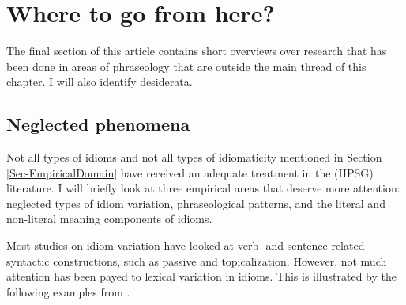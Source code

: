 \documentclass[output=paper]{langsci/langscibook}
\begin{document}


\section{Where to go from here?}
\label{Sec-WhereToGo}

The final section of this article contains short overviews over research that has been done in areas of phraseology that are outside the main thread of this chapter. I will also identify desiderata. 


\subsection{Neglected phenomena}
\label{Sec-Neglected}

Not all types of idioms  and not all types of idiomaticity mentioned in Section \ref{Sec-EmpiricalDomain} have received an adequate treatment in the (HPSG) literature.
I will briefly look at three empirical areas that deserve more attention: neglected types of idiom variation, phraseological patterns, and the literal and non-literal meaning components of idioms.

\bigskip%
Most studies on idiom variation have looked at verb- and sentence-related syntactic constructions, such as passive and topicalization. 
However, not much attention has been payed to lexical variation in idioms. This is illustrated by the following examples from \citet[, 191]{Richards:01}. 
\end{document}
